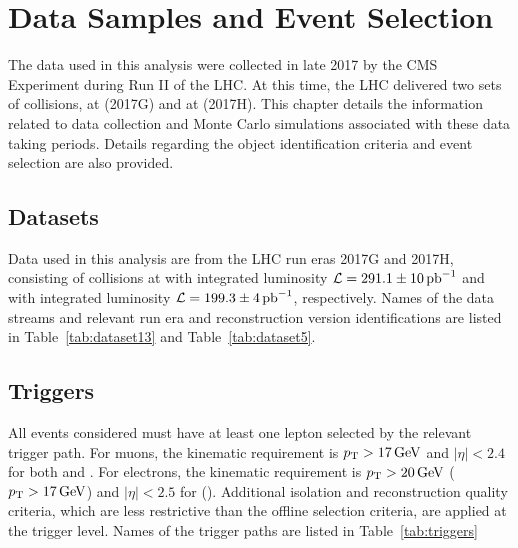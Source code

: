 \chapter{Data Samples and Event Selection}\label{ch:data}
The data used in this analysis were collected in late 2017 by the CMS Experiment during Run II of the LHC. At this time, the LHC delivered two sets of \pp collisions, at \sg (2017G) and at \sh (2017H). This chapter details the information related to data collection and Monte Carlo simulations associated with these data taking periods. Details regarding the object identification criteria and event selection are also provided.



\section{Datasets}\label{ch:data:dataset}
Data used in this analysis are from the LHC run eras 2017G and 2017H, consisting of \pp collisions at \sg with integrated luminosity $\mathcal{L}=291.1\pm 10 \,\mathrm{pb}^{-1}$ and \sh with integrated luminosity $\mathcal{L}=199.3\pm 4 \,\mathrm{pb}^{-1}$, respectively. Names of the data streams and relevant run era and reconstruction version identifications are listed in Table~\ref{tab:dataset13} and Table~\ref{tab:dataset5}. 


\section{Triggers}\label{ch:data:triggers}
All events considered must have at least one lepton selected by the relevant trigger path. For muons, the kinematic requirement is $p_{\mathrm{T}}>17\,\text{Ge\hspace{-.08em}V}$ and $|\eta|<2.4$ for both \sg and \sh. For electrons, the kinematic requirement is $p_{\mathrm{T}}>20\,\text{Ge\hspace{-.08em}V}$ ($p_{\mathrm{T}}>17\,\text{Ge\hspace{-.08em}V}$) and $|\eta|<2.5$ for \sg (\sh). Additional isolation and reconstruction quality criteria, which are less restrictive than the offline selection criteria, are applied at the trigger level. Names of the trigger paths are listed in  Table~\ref{tab:triggers}




